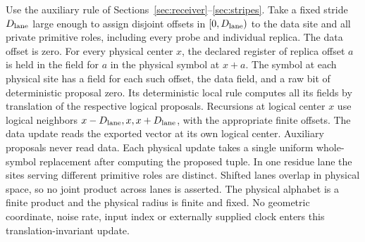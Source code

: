 Use the auxiliary rule of Sections~\ref{sec:receiver}--\ref{sec:stripes}. Take a fixed stride \(D_{\rm lane}\) large enough to assign disjoint offsets in \([0,D_{\rm lane})\) to the data site and all private primitive roles, including every probe and individual replica. The data offset is zero. For every physical center \(x\), the declared register of replica offset \(a\) is held in the field for \(a\) in the physical symbol at \(x+a\). The symbol at each physical site has a field for each such offset, the data field, and a raw bit of deterministic proposal zero. Its deterministic local rule computes all its fields by translation of the respective logical proposals. Recursions at logical center \(x\) use logical neighbors \(x-D_{\rm lane},x,x+D_{\rm lane}\), with the appropriate finite offsets. The data update reads the exported vector at its own logical center. Auxiliary proposals never read data. Each physical update takes a single uniform whole-symbol replacement after computing the proposed tuple. In one residue lane the sites serving different primitive roles are distinct. Shifted lanes overlap in physical space, so no joint product across lanes is asserted. The physical alphabet is a finite product and the physical radius is finite and fixed. No geometric coordinate, noise rate, input index or externally supplied clock enters this translation-invariant update.

